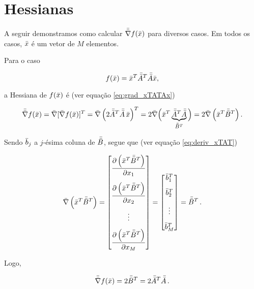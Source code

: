 \section{Hessianas}

A seguir demonstramos como calcular $\bar{\bar{\nabla}}f(\bar{x})$
para diversos casos.
Em todos os casos, $\bar{x}$ é um vetor de $M$ elementos.

\begin{example}
    Para o caso

    \begin{equation}
    f(\bar{x}) = \bar{x}^T\bar{\bar{A}}^T\bar{\bar{A}}\bar{x},
    \end{equation}
    
    \noindent a Hessiana de $f(\bar{x})$ é (ver equação \ref{eq:grad_xTATAx})
    
    \begin{equation}
        \bar{\bar{\nabla}}f(\bar{x}) =
        \bar{\nabla}[\bar{\nabla}f(\bar{x})]^T =
        \bar{\nabla}\left(2\bar{\bar{A}}^T\bar{\bar{A}}\thinspace\bar{x}\right)^T =
        2\bar{\nabla}\Big(\bar{x}^T\underbrace{\bar{\bar{A}}^T\bar{\bar{A}}}_{\bar{\bar{B}}^T}\Big) =
        2\bar{\nabla}\left(\bar{x}^T\bar{\bar{B}}^T\right).
    \end{equation}

    \noindent Sendo $\bar{b}_j$ a $j$-ésima coluna de $\bar{\bar{B}}$, segue que
    (ver equação \ref{eq:deriv_xTAT})
        
    \begin{equation}
        \vect{\nabla}\left(\vect{x}^T\mat{B}^T\right) = 
        \begin{bmatrix}
        \dfrac{\partial \left(\vect{x}^T\mat{B}^T\right)}{\partial x_1} \vspace{0.3cm}\\
        \dfrac{\partial \left(\vect{x}^T\mat{B}^T\right)}{\partial x_2} \vspace{0.3cm}\\
        \vdots \vspace{0.3cm}\\
        \dfrac{\partial \left(\vect{x}^T\mat{B}^T\right)}{\partial x_M}
        \end{bmatrix}
        =
        \begin{bmatrix}
        \vect{b}_1^T \vspace{0.3cm}\\
        \vect{b}_2^T \vspace{0.3cm}\\
        \vdots \vspace{0.3cm}\\
        \vect{b}_M^T
        \end{bmatrix}
        =
        \mat{B}^T
        \thinspace .
    \end{equation}

    \noindent Logo,
    
    \begin{equation}
        \bar{\bar{\nabla}}f(\bar{x}) =
        2\bar{\bar{B}}^T = 2\bar{\bar{A}}^T\bar{\bar{A}}
        \thinspace .
    \end{equation}
\end{example}
